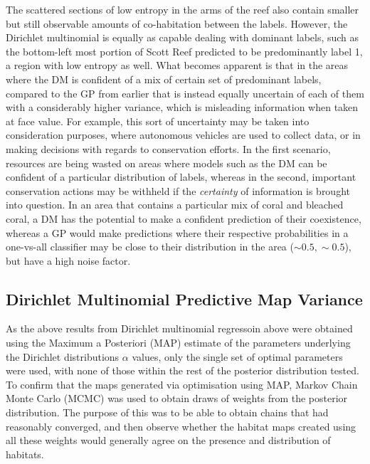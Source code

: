 The scattered sections of low entropy in the arms of the reef also contain smaller but still observable amounts of co-habitation between the labels. However, the Dirichlet multinomial is equally as capable dealing with dominant labels, such as the bottom-left most portion of Scott Reef predicted to be predominantly label 1, a region with low entropy as well. What becomes apparent is that in the areas where the DM is confident of a mix of certain set of predominant labels, compared to the GP from earlier that is instead equally uncertain of each of them with a considerably higher variance, which is misleading information when taken at face value. For example, this sort of uncertainty may be taken into consideration purposes, where autonomous vehicles are used to collect data, or in making decisions with regards to conservation efforts. In the first scenario, resources are being wasted on areas where models such as the DM can be confident of a particular distribution of labels, whereas in the second, important conservation actions may be withheld if the \textit{certainty} of information is brought into question. In an area that contains a particular mix of coral and bleached coral, a DM has the potential to make a confident prediction of their coexistence, whereas a GP would make predictions where their respective probabilities in a one-vs-all classifier may be close to their distribution in the area ($\sim 0.5, \sim 0.5$), but have a high noise factor.

\subsection{Dirichlet Multinomial Predictive Map Variance}

As the above results from Dirichlet multinomial regressoin above were obtained using the Maximum a Posteriori (MAP) estimate of the parameters underlying the Dirichlet distributions $\alpha$ values, only the single set of optimal parameters were used, with none of those within the rest of the posterior distribution tested. To confirm that the maps generated via optimisation using MAP, Markov Chain Monte Carlo (MCMC) was used to obtain draws of weights from the posterior distribution. The purpose of this was to be able to obtain chains that had reasonably converged, and then observe whether the habitat maps created using all these weights would generally agree on the presence and distribution of habitats. 

